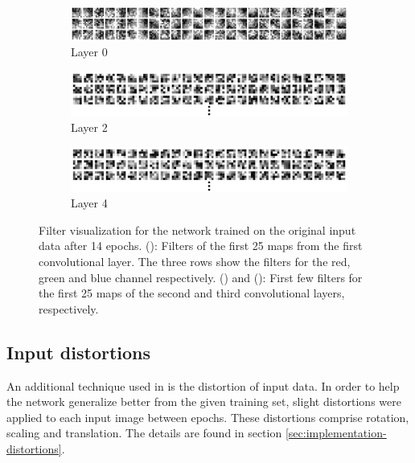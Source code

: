 \documentclass[11pt, a4paper]{article}
\begin{document}
\begin{figure}
	\centering
	\begin{subfigure}{\textwidth}
		\includegraphics[width=1\textwidth]{filter_visualizations/gtsrb_nomorph_filters_0}
		\caption{Layer 0}
		\label{fig:gtsrb-filters-0}
	\end{subfigure}
	\begin{subfigure}{\textwidth}
		\includegraphics[width=1\textwidth]{filter_visualizations/gtsrb_nomorph_filters_2}
		\caption{Layer 2}
		\label{fig:gtsrb-filters-2}
	\end{subfigure}
	\begin{subfigure}{\textwidth}
		\includegraphics[width=1\textwidth]{filter_visualizations/gtsrb_nomorph_filters_4}
		\caption{Layer 4}
		\label{fig:gtsrb-filters-4}
	\end{subfigure}
	\caption{Filter visualization for the network trained on the original input data after 14 epochs. (): Filters of the first 25 maps from the first convolutional layer. The three rows show the filters for the red, green and blue channel respectively. () and (): First few filters for the first 25 maps of the second and third convolutional layers, respectively.}
	\label{fig:gtsrb-filters}
\end{figure}

\subsection{Input distortions}
\label{subsec:inputdistortions}

An additional technique used in \cite{multi-column-neural-network-gtsrb} is the distortion of input data. In order to help the network generalize better from the given training set, slight distortions were applied to each input image between epochs. These distortions comprise rotation, scaling and translation. The details are found in section \ref{sec:implementation-distortions}.
\end{document}
